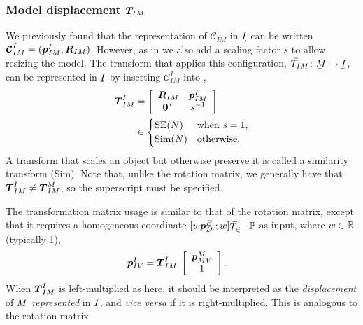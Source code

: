 \subsubsection{Model displacement $\boldsymbol{T}_{\!IM}$}

We previously found that the representation of $\mathcal{C}_{IM}$ in $\uvec{I}$ can be written $\boldsymbol{\mathcal{C}}_{IM}^I = (\boldsymbol{p}_{IM}^I,\boldsymbol{R}_{IM})$. However, as in  we also add a scaling factor $s$ to allow resizing the model. The transform that applies this configuration, $\vec{T}_{IM}\colon \ubar{M}\to\ubar{I}$, can be represented in $\ubar{I}$ by inserting $\boldsymbol{\mathcal{C}}_{IM}^I$ into ,
%
\begin{align}
\dvec{T}_{IM}^I &= 
\left[\begin{array}{c c}
 \mat{R}_{IM}  & \dvec{p}_{IM}^I \\%
 \dvec{0}^T  &  s^{-1}
\end{array}\right] \nn &\in
\begin{cases}
\mathrm{SE}(N) & \mathrm{when}\ s=1,\\
\mathrm{Sim}(N) & \mathrm{otherwise},
\end{cases} \label{eq_homogeneous_transformation}
\end{align}
%
A transform that scales an object but otherwise preserve it is called a similarity transform (Sim). Note that, unlike the rotation matrix, we generally have that $\boldsymbol{T}_{IM}^I \ne \boldsymbol{T}_{IM}^M$, so the superscript must be specified.

The transformation matrix usage is similar to that of the rotation matrix, except that it requires a homogeneous coordinate $[w\dvec{p}_{D\cdot}^E;w]\T\in\mathbb{P}$ as input, where $w\in\mathbb{R}$ (typically 1),
%
\begin{align}
\boldsymbol{p}_{IV}^I &= \boldsymbol{T}_{IM}^I\; 
\left[\begin{array}{c}\boldsymbol{p}_{MV}^M \\ 1
\end{array}\right].
\end{align}
%
When $\boldsymbol{T}_{IM}^I$ is left-multiplied as here, it should be interpreted as the \emph{displacement} of $\ubar{M}$ \emph{represented} in $\ubar{I}$, and \emph{vice versa} if it is right-multiplied. This is analogous to the rotation matrix. 


